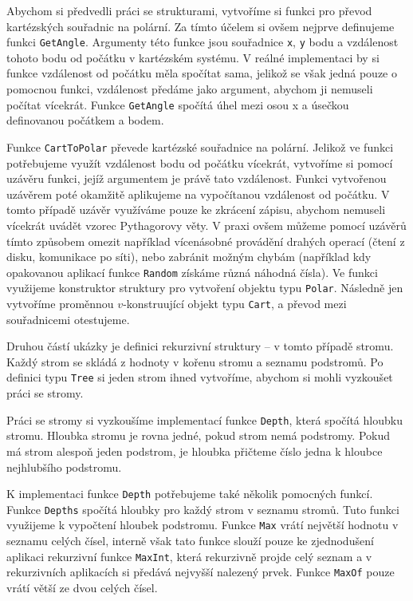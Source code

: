 Abychom si předvedli práci se strukturami, vytvoříme si funkci pro převod kartézských souřadnic
na polární. Za tímto účelem si ovšem nejprve definujeme funkci \lstinline{GetAngle}. Argumenty
této funkce jsou souřadnice \lstinline{x}, \lstinline{y} bodu a vzdálenost tohoto bodu od počátku
v kartézském systému. V reálné implementaci by si funkce vzdálenost od počátku měla spočítat sama,
jelikož se však jedná pouze o pomocnou funkci, vzdálenost předáme jako argument, abychom ji nemuseli
počítat vícekrát. Funkce \lstinline{GetAngle} spočítá úhel mezi osou x a úsečkou definovanou
počátkem a bodem.

Funkce \lstinline{CartToPolar} převede kartézské souřadnice na polární. Jelikož ve funkci
potřebujeme využít vzdálenost bodu od počátku vícekrát, vytvoříme si pomocí uzávěru funkci, jejíž
argumentem je právě tato vzdálenost. Funkci vytvořenou uzávěrem poté okamžitě aplikujeme
na vypočítanou vzdálenost od počátku. V tomto případě uzávěr využíváme pouze ke zkrácení zápisu,
abychom nemuseli vícekrát uvádět vzorec Pythagorovy věty. V praxi ovšem můžeme pomocí uzávěrů
tímto způsobem omezit například vícenásobné provádění drahých operací (čtení z disku, komunikace
po síti), nebo zabránit možným chybám (například kdy opakovanou aplikací funkce \lstinline{Random}
získáme různá náhodná čísla). Ve funkci využijeme konstruktor struktury pro vytvoření objektu typu
\lstinline{Polar}. Následně jen vytvoříme proměnnou $v$-konstruující objekt typu \lstinline{Cart},
a převod mezi souřadnicemi otestujeme.

Druhou částí ukázky je definici rekurzivní struktury -- v tomto případě stromu. Každý strom se skládá
z hodnoty v kořenu stromu a seznamu podstromů. Po definici typu \lstinline{Tree} si jeden strom
ihned vytvoříme, abychom si mohli vyzkoušet práci se stromy.

Práci se stromy si vyzkoušíme implementací funkce \lstinline{Depth}, která spočítá hloubku stromu.
Hloubka stromu je rovna jedné, pokud strom nemá podstromy. Pokud má strom alespoň jeden podstrom,
je hloubka přičteme číslo jedna k hloubce nejhlubšího podstromu.

K implementaci funkce \lstinline{Depth} potřebujeme také několik pomocných funkcí. Funkce
\lstinline{Depths} spočítá hloubky pro každý strom v seznamu stromů. Tuto funkci využijeme
k vypočtení hloubek podstromu. Funkce \lstinline{Max} vrátí největší hodnotu v seznamu celých
čísel, interně však tato funkce slouží pouze ke zjednodušení aplikaci rekurzivní funkce
\lstinline{MaxInt}, která rekurzivně projde celý seznam a v rekurzivních aplikacích si předává
nejvyšší nalezený prvek. Funkce \lstinline{MaxOf} pouze vrátí větší ze dvou celých čísel.

